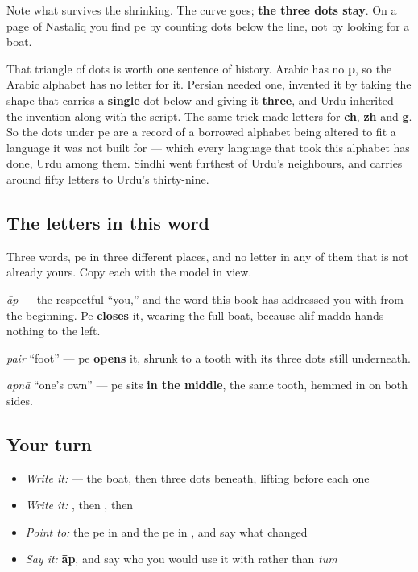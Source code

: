 Note what survives the shrinking. The curve goes; \textbf{the three dots stay}. On a page of Nastaliq you find pe by counting dots below the line, not by looking for a boat.

That triangle of dots is worth one sentence of history. Arabic has no \textbf{p}, so the Arabic alphabet has no letter for it. Persian needed one, invented it by taking the shape that carries a \textbf{single} dot below and giving it \textbf{three}, and Urdu inherited the invention along with the script. The same trick made letters for \textbf{ch}, \textbf{zh} and \textbf{g}. So the dots under pe are a record of a borrowed alphabet being altered to fit a language it was not built for — which every language that took this alphabet has done, Urdu among them. Sindhi went furthest of Urdu's neighbours, and carries around fifty letters to Urdu's thirty-nine.

\subsection*{The letters in this word}
Three words, pe in three different places, and no letter in any of them that is not already yours. Copy each with the model in view.

\begin{quote}
\end{quote}

\begin{quote}
\end{quote}

\begin{quote}
\end{quote}

\textbf{} \emph{āp} — the respectful \textquotedblleft{}you,\textquotedblright{} and the word this book has addressed you with from the beginning. Pe \textbf{closes} it, wearing the full boat, because alif madda hands nothing to the left.

\textbf{} \emph{pair} \textquotedblleft{}foot\textquotedblright{} — pe \textbf{opens} it, shrunk to a tooth with its three dots still underneath.

\textbf{} \emph{apnā} \textquotedblleft{}one's own\textquotedblright{} — pe sits \textbf{in the middle}, the same tooth, hemmed in on both sides.

\subsection*{Your turn}
\begin{itemize}
\raggedright
  \item \emph{Write it:}  — the boat, then three dots beneath, lifting before each one
  \item \emph{Write it:} , then , then 
  \item \emph{Point to:} the pe in  and the pe in , and say what changed
  \item \emph{Say it:} \textbf{āp}, and say who you would use it with rather than \emph{tum}
\end{itemize}

